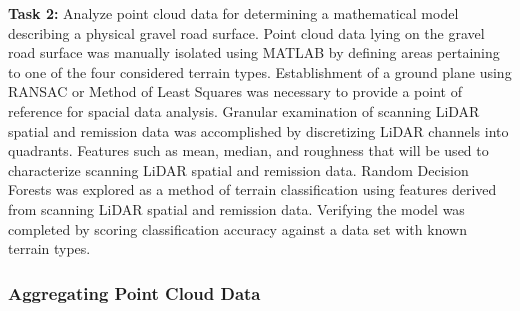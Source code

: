 \documentclass[numbered,pdftex]{ohio-etd}
\begin{document}
{{{			\textbf{Task 2: }{Analyze point cloud data for determining a mathematical model describing a physical gravel road surface. Point cloud data lying on the gravel road surface was manually isolated using MATLAB by defining areas pertaining to one of the four considered terrain types. Establishment of a ground plane using RANSAC or Method of Least Squares was necessary to provide a point of reference for spacial data analysis. Granular examination of scanning LiDAR spatial and remission data was accomplished by discretizing LiDAR channels into quadrants. Features such as mean, median, and roughness that will be used to characterize scanning LiDAR spatial and remission data. Random Decision Forests was explored as a method of terrain classification using features derived from scanning LiDAR spatial and remission data. Verifying the model was completed by scoring classification accuracy against a  data set with known terrain types.}
			
%				
%			
%			

			\subsubsection{Aggregating Point Cloud Data}\label{sec:aggregating_point_cloud_data}{
			
}}}}
\end{document}
